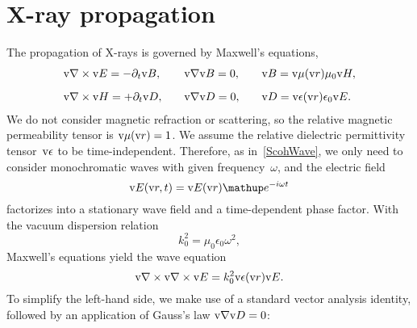 %
%

\section{X-ray propagation}\label{SXray}
%
%

The propagation of X-rays is governed by Maxwell's equations,
%
\begin{equation}
  \begin{array}{lll}
    \text{v}{\nabla}\times\text{v}{E}=-\partial_t \text{v}{B},\quad
   &\text{v}{\nabla}\text{v}{B}=0,\quad
   &\text{v}{B}=\text{v}{\mu}(\text{v}{r})\mu_0\text{v}{H},
   \\[2ex]
    \text{v}{\nabla}\times\text{v}{H}=+\partial_t \text{v}{D},\quad
   &\text{v}{\nabla}\text{v}{D}=0,\quad
   &\text{v}{D}=\text{v}{\epsilon}(\text{v}{r})\epsilon_0\text{v}{E}.
  \end{array}
\end{equation}
We do not consider magnetic refraction or scattering,
so the relative magnetic permeability tensor is $\text{v}{\mu}(\text{v}{r})=1$.
%
%
We assume the relative dielectric permittivity tensor~$\text{v}{\epsilon}$
%
%
to be time-independent.
Therefore, as in~\cref{ScohWave}, we only need to consider monochromatic waves
%
%
with given frequency~$\omega$, and the electric field
%
\begin{equation}
  \v{E}(\r,t) = \v{E}(\r)\e^{-i\omega t}
\end{equation}
factorizes into a stationary wave field and a time-dependent phase factor.
With the vacuum dispersion relation
\begin{equation}
  k_0^2 = \mu_0\epsilon_0\omega^2,
\end{equation}
%
Maxwell's equations yield the wave equation
\begin{equation}\label{ENabNabE}
  \text{v}{\nabla}\times\text{v}{\nabla}\times\text{v}{E} = k_0^2\text{v}{\epsilon}(\text{v}{r})\text{v}{E}.
\end{equation}
%
To simplify the left-hand side,
we make use of a standard vector analysis identity,
followed by an application of Gauss's law $\text{v}{\nabla}\text{v}{D}=0$:
%
